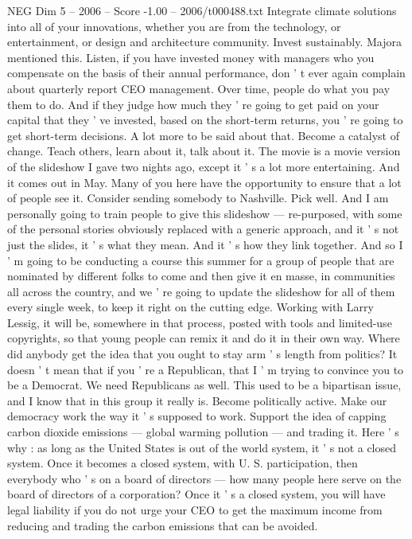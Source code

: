 \begin{textsample}{NEG Dim 5 – 2006 – Score -1.00 – 2006/t000488.txt}
Integrate climate solutions into all of your innovations, whether you are from the technology, or entertainment, or design and architecture community.
Invest sustainably.
Majora mentioned this.
Listen, if you have invested money with managers who you compensate on the basis of their annual performance, don ' t ever again complain about quarterly report CEO management.
Over time, people do what you pay them to do.
And if they judge how much they ' re going to get paid on your capital that they ' ve invested, based on the short-term returns, you ' re going to get short-term decisions.
A lot more to be said about that.
Become a catalyst of change.
Teach others, learn about it, talk about it.
The movie is a movie version of the slideshow I gave two nights ago, except it ' s a lot more entertaining.
And it comes out in May.
Many of you here have the opportunity to ensure that a lot of people see it.
Consider sending somebody to Nashville.
Pick well.
And I am personally going to train people to give this slideshow — re-purposed, with some of the personal stories obviously replaced with a generic approach, and it ' s not just the slides, it ' s what they mean.
And it ' s how they link together.
And so I ' m going to be conducting a course this summer for a group of people that are nominated by different folks to come and then give it en masse, in communities all across the country, and we ' re going to update the slideshow for all of them every single week, to keep it right on the cutting edge.
Working with Larry Lessig, it will be, somewhere in that process, posted with tools and limited-use copyrights, so that young people can remix it and do it in their own way.
Where did anybody get the idea that you ought to stay arm ' s length from politics?
It doesn ' t mean that if you ' re a Republican, that I ' m trying to convince you to be a Democrat.
We need Republicans as well.
This used to be a bipartisan issue, and I know that in this group it really is.
Become politically active.
Make our democracy work the way it ' s supposed to work.
Support the idea of capping carbon dioxide emissions — global warming pollution — and trading it.
Here ' s why : as long as the United States is out of the world system, it ' s not a closed system.
Once it becomes a closed system, with U.
S. participation, then everybody who ' s on a board of directors — how many people here serve on the board of directors of a corporation?
Once it ' s a closed system, you will have legal liability if you do not urge your CEO to get the maximum income from reducing and trading the carbon emissions that can be avoided.

\end{textsample}
